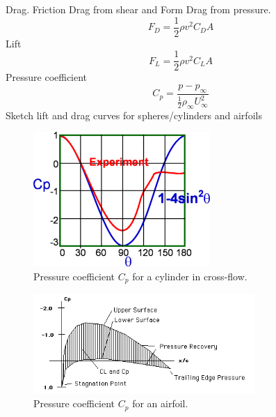 \documentclass{article}
\begin{document}
Drag. Friction Drag from shear and Form Drag from pressure. 
\begin{equation}
  F_D = \frac{1}{2}\rho v^2 C_D A
\end{equation}
\newline
\newline
Lift
\begin{equation}
  F_L = \frac{1}{2}\rho v^2 C_L A
\end{equation}
\newline
\newline
Pressure coefficient
\begin{equation}
  C_p = \frac{p-p_\infty}{\frac{1}{2}\rho_\infty U^2_\infty}
\end{equation}
\newline
\newline
Sketch lift and drag curves for spheres/cylinders and airfoils
\begin{figure}[!ht]
\centering
\includegraphics[width=0.6\textwidth]{./Figures/cpdist}
\caption{Pressure coefficient $C_p$ for a cylinder in cross-flow.}
\end{figure}
\begin{figure}[!ht]
\centering
\includegraphics[width=0.75\textwidth]{./Figures/AirfoilCp}
\caption{Pressure coefficient $C_p$ for an airfoil.}
\end{figure}
\end{document}
